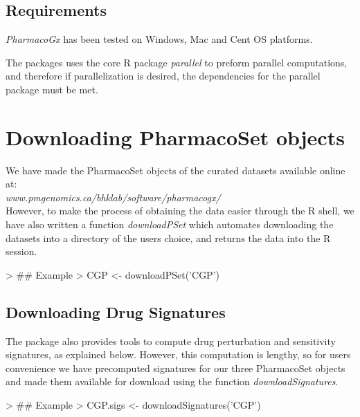 \documentclass[11pt]{article}
\begin{document}
\subsection{Requirements}

\textit{PharmacoGx} has been tested on Windows, Mac and Cent OS platforms.

The packages uses the core R package \textit{parallel} to preform parallel computations, and therefore if parallelization is desired, the dependencies for the parallel package must be met. 

\section{Downloading PharmacoSet objects}

We have made the PharmacoSet objects of the curated datasets available online at:\\ \textit{www.pmgenomics.ca/bhklab/software/pharmacogx/}\\
However, to make the process of obtaining the data easier through the R shell, we have also written a function \textit{downloadPSet} which automates downloading the datasets into a directory of the users choice, and returns the data into the R session. 

\begin{Schunk}
\begin{Sinput}
> ## Example
> CGP <- downloadPSet('CGP') 
\end{Sinput}
\end{Schunk}
\subsection{Downloading Drug Signatures}

The package also provides tools to compute drug perturbation and sensitivity signatures, as explained below. However, this computation is lengthy, so for users convenience we have precomputed signatures for our three PharmacoSet objects and made them available for download using the function \textit{downloadSignatures}.

\begin{Schunk}
\begin{Sinput}
> ## Example
> CGP.sigs <- downloadSignatures('CGP')
\end{Sinput}
\end{Schunk}
\end{document}
